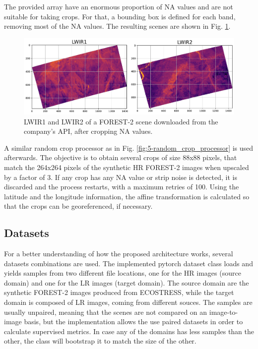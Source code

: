     The provided array have an enormous proportion of NA values and are not suitable for taking crops.
    For that, a bounding box is defined for each band, removing most of the NA values. 
    The resulting scenes are shown in Fig. \ref{fig:4-forest-bounding-box}.

    \begin{figure}[H]
        \centering
        \includegraphics[width=\linewidth]{Includes/4-forest2-cropped-bands.pdf}
        \caption{LWIR1 and LWIR2 of a FOREST-2 scene downloaded from the company's API, after cropping NA values.}
        \label{fig:4-forest-bounding-box}
    \end{figure}

    A similar random crop processor as in Fig. \ref{fig:5-random_crop_processor} is used afterwards. 
    The objective is to obtain several crops of size 88x88 pixels, that match the 264x264 pixels of the synthetic HR FOREST-2 images when upscaled by a factor of 3.
    If any crop has any NA value or strip noise is detected, it is discarded and the process restarts, with a maximum retries of 100.
    Using the latitude and the longitude information, the affine transformation is calculated so that the crops can be georeferenced, if necessary.
    
\subsection{Datasets}

For a better understanding of how the proposed architecture works, several datasets combinations are used. 
The implemented pytorch dataset class loads and yields samples from two different file locations, one for the HR images (source domain) and one for the LR images (target domain). 
The source domain are the synthetic FOREST-2 images produced from ECOSTRESS, while the target domain is composed of LR images, coming from different souces.
The samples are usually unpaired, meaning that the scenes are not compared on an image-to-image basis, but the implementation allows the use paired datasets in order to calculate supervised metrics. 
In case any of the domains has less samples than the other, the class will bootstrap it to match the size of the other.



